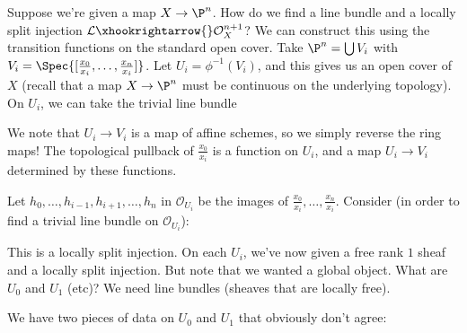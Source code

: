 Suppose we're given a map $X\to\P^n$. How do we find a line bundle and a locally split injection $\mathcal{L}\xhookrightarrow{}\mathcal{O}_X^{n+1}$?
We can construct this using the transition functions on the standard open cover.
Take $\P^n=\bigcup V_i$ with $V_i=\Spec{[\frac{x_0}{x_i},\dots,\frac{x_n}{x_i}]}$.
Let $U_i=\phi^{-1}(V_i)$, and this gives us an open cover of $X$ (recall that a map $X\to\P^n$ must be continuous on the underlying topology).
On $U_i$, we can take the trivial line bundle
\begin{figure}[H]
    \centering
\end{figure}

We note that $U_i\to V_i$ is a map of affine schemes, so we simply reverse the ring maps!
The topological pullback of $\frac{x_0}{x_i}$ is a function on $U_i$, and a map $U_i\to V_i$ determined by these functions.

Let $h_0,\dots,h_{i-1},h_{i+1},\dots,h_n$ in $\mathcal{O}_{U_i}$ be the images of $\frac{x_0}{x_i},\dots,\frac{x_n}{x_i}$.
Consider (in order to find a trivial line bundle on $\mathcal{O}_{U_i}$):
\begin{figure}[H]
    \centering
\end{figure}

This is a locally split injection.
On each $U_i$, we've now given a free rank $1$ sheaf and a locally split injection.
But note that we wanted a global object. What are $U_0$ and $U_1$ (etc)?
We need line bundles (sheaves that are locally free).

We have two pieces of data on $U_0$ and $U_1$ that obviously don't agree:
\begin{figure}[H]
    \centering
\end{figure}

